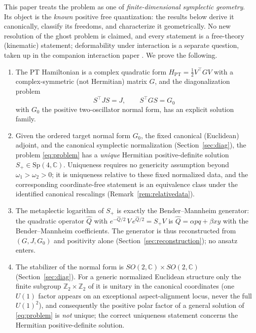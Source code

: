 \documentclass[11pt]{article}
\theoremstyle{definition}
\theoremstyle{remark}
\newcommand{\C}{\mathbb{C}}
\newcommand{\Z}{\mathbb{Z}}
\newcommand{\w}{\omega}
\newcommand{\Sp}{\mathrm{Sp}}
\begin{document}
This paper treats the problem as one of \emph{finite-dimensional symplectic
geometry}.  Its object is the \emph{known} positive free quantization: the
results below derive it canonically, classify its freedoms, and
characterize it geometrically.  No new resolution of the ghost problem is
claimed, and every statement is a free-theory (kinematic) statement;
deformability under interaction is a separate question, taken up in the
companion interaction paper \cite{companionV}.  We prove the following.

\begin{enumerate}
\item The PT Hamiltonian is a complex quadratic form
$H_{\mathrm{PT}}=\tfrac12 V^{\top}GV$ with a complex-symmetric (not Hermitian)
matrix $G$, and the diagonalization problem
\begin{equation}\label{eq:problem}
S^{\top}JS=J,\qquad S^{\top}GS=G_0
\end{equation}
with $G_0$ the positive two-oscillator normal form, has an explicit solution
family.

\item Given the ordered target normal form $G_0$, the fixed canonical
(Euclidean) adjoint, and the canonical symplectic normalization
(Section~\ref{sec:diag}), the problem \eqref{eq:problem} has a
\emph{unique} Hermitian positive-definite
solution $S_+\in \Sp(4,\C)$.  Uniqueness requires no genericity assumption
beyond $\w_1>\w_2>0$; it is uniqueness relative to these fixed normalized
data, and the corresponding coordinate-free statement is an equivalence
class under the identified canonical rescalings
(Remark~\ref{rem:relativedata}).

\item The metaplectic logarithm of $S_+$ is exactly the Bender--Mannheim
generator: the quadratic operator $\widehat Q$ with
$e^{-\widehat Q/2}\,V\,e^{\widehat Q/2}=S_+V$ is
$\widehat Q=\alpha pq+\beta xy$ with the Bender--Mannheim coefficients.  The
generator is thus reconstructed from $(G,J,G_0)$ and positivity alone
(Section~\ref{sec:reconstruction}); no ansatz enters.

\item The stabilizer of the normal form is $SO(2,\C)\times SO(2,\C)$
(Section~\ref{sec:diag}).  For a generic normalized Euclidean structure
only the finite subgroup $\Z_2\times\Z_2$ of it is unitary in the
canonical coordinates (one $U(1)$ factor appears on an exceptional
aspect-alignment locus, never the full $U(1)^2$), and consequently the
positive polar factor of a
general solution of \eqref{eq:problem} is \emph{not} unique; the correct
uniqueness statement concerns the Hermitian positive-definite solution.


\end{enumerate}
\end{document}
